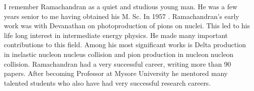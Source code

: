 I remember Ramachandran as a quiet and studious young man. He was a few years senior to me having obtained his M. Sc. In 1957 . Ramachandran’s early work was with Devanathan on photoproduction of pions on nuclei. This led to his life long interest in intermediate energy physics. He made many important contributions to this field. Among his most significant works is Delta production in inelastic nucleon nucleus collision and pion production in nucleon  nucleon  collision.  Ramachandran had a very successful career, writing more than 90 papers. After becoming Professor at Mysore University he mentored many talented students who also have had very successful  research careers.



